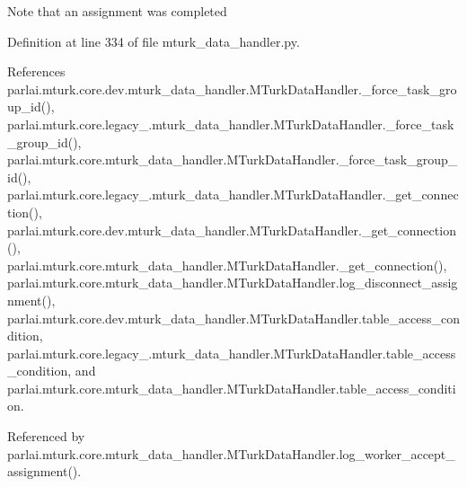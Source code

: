 \begin{DoxyVerb}Note that an assignment was completed\end{DoxyVerb}
 

Definition at line 334 of file mturk\+\_\+data\+\_\+handler.\+py.



References parlai.\+mturk.\+core.\+dev.\+mturk\+\_\+data\+\_\+handler.\+M\+Turk\+Data\+Handler.\+\_\+force\+\_\+task\+\_\+group\+\_\+id(), parlai.\+mturk.\+core.\+legacy\+\_.\+mturk\+\_\+data\+\_\+handler.\+M\+Turk\+Data\+Handler.\+\_\+force\+\_\+task\+\_\+group\+\_\+id(), parlai.\+mturk.\+core.\+mturk\+\_\+data\+\_\+handler.\+M\+Turk\+Data\+Handler.\+\_\+force\+\_\+task\+\_\+group\+\_\+id(), parlai.\+mturk.\+core.\+legacy\+\_.\+mturk\+\_\+data\+\_\+handler.\+M\+Turk\+Data\+Handler.\+\_\+get\+\_\+connection(), parlai.\+mturk.\+core.\+dev.\+mturk\+\_\+data\+\_\+handler.\+M\+Turk\+Data\+Handler.\+\_\+get\+\_\+connection(), parlai.\+mturk.\+core.\+mturk\+\_\+data\+\_\+handler.\+M\+Turk\+Data\+Handler.\+\_\+get\+\_\+connection(), parlai.\+mturk.\+core.\+mturk\+\_\+data\+\_\+handler.\+M\+Turk\+Data\+Handler.\+log\+\_\+disconnect\+\_\+assignment(), parlai.\+mturk.\+core.\+dev.\+mturk\+\_\+data\+\_\+handler.\+M\+Turk\+Data\+Handler.\+table\+\_\+access\+\_\+condition, parlai.\+mturk.\+core.\+legacy\+\_.\+mturk\+\_\+data\+\_\+handler.\+M\+Turk\+Data\+Handler.\+table\+\_\+access\+\_\+condition, and parlai.\+mturk.\+core.\+mturk\+\_\+data\+\_\+handler.\+M\+Turk\+Data\+Handler.\+table\+\_\+access\+\_\+condition.



Referenced by parlai.\+mturk.\+core.\+mturk\+\_\+data\+\_\+handler.\+M\+Turk\+Data\+Handler.\+log\+\_\+worker\+\_\+accept\+\_\+assignment().


